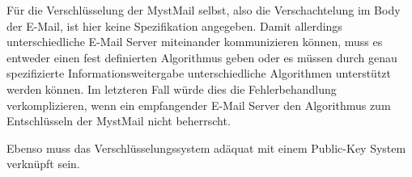 Für die Verschlüsselung der MystMail selbst, also die Verschachtelung im Body der E-Mail, ist hier keine Spezifikation angegeben. Damit allerdings unterschiedliche E-Mail Server miteinander kommunizieren können, muss es entweder einen fest definierten Algorithmus geben oder es müssen durch genau spezifizierte Informationsweitergabe unterschiedliche Algorithmen unterstützt werden können. Im letzteren Fall würde dies die Fehlerbehandlung verkomplizieren, wenn ein empfangender E-Mail Server den Algorithmus zum Entschlüsseln der MystMail nicht beherrscht.

Ebenso muss das Verschlüsselungssystem adäquat mit einem Public-Key System verknüpft sein.
